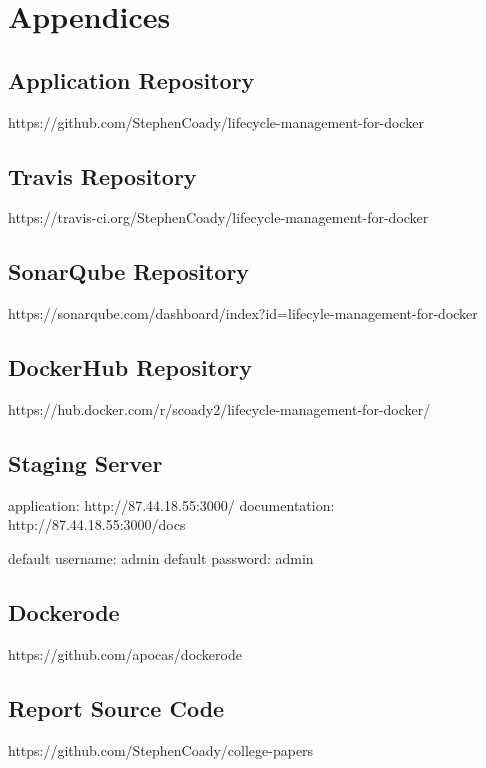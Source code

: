 \appendix
\section*{Appendices}
\renewcommand{\thesubsection}{\Alph{subsection}}

\subsection{Application Repository}
\label{appendix:code}
https://github.com/StephenCoady/lifecycle-management-for-docker

\subsection{Travis Repository} 
\label{appendix:travis}
https://travis-ci.org/StephenCoady/lifecycle-management-for-docker

\subsection{SonarQube Repository} 
\label{appendix:sonarqube}
https://sonarqube.com/dashboard/index?id=lifecyle-management-for-docker

\subsection{DockerHub Repository} 
\label{appendix:dockerhub}
https://hub.docker.com/r/scoady2/lifecycle-management-for-docker/

\subsection{Staging Server} 
\label{appendix:staging}
application: http://87.44.18.55:3000/ \newline
documentation: http://87.44.18.55:3000/docs

default username: admin \newline
default password: admin

\subsection{Dockerode} 
\label{appendix:dockerode_appendix}
https://github.com/apocas/dockerode

\subsection{Report Source Code} 
\label{appendix:reports}
https://github.com/StephenCoady/college-papers

